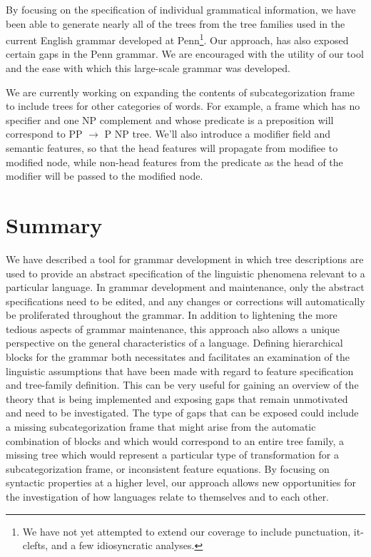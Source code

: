  
 
By focusing on the specification of individual grammatical information, we 
have been able to generate nearly all of the trees from the tree families 
used in the current English grammar developed at Penn\footnote{We have not yet attempted to extend our coverage to include punctuation, it-clefts, and a few idiosyncratic analyses.}. 
 Our approach, has also exposed certain gaps in the Penn grammar. 
We are encouraged with the utility of our tool and the ease with which this 
large-scale grammar was developed. 
 
 
We are currently working on expanding the contents of 
subcategorization frame to include 
trees for other categories of words. For example, 
a frame which has no specifier and one NP complement 
and whose predicate is a preposition will correspond to 
PP $\rightarrow$ P NP tree. We'll also introduce a modifier field 
and semantic features, so that the head features will propagate 
from modifiee to modified node, while non-head features from 
the predicate as the head of the modifier will be passed to 
the modified node. 
 
 
 
 
 
 
 
\section{Summary} 
 
We have described a tool for grammar development in which tree descriptions are 
used to provide an abstract specification of the linguistic phenomena relevant 
to a particular language.  In grammar development and maintenance, only the 
abstract specifications need to be edited, and any changes or corrections will 
automatically be proliferated throughout the grammar.  In addition to 
lightening the more tedious aspects of grammar maintenance, this approach also 
allows a unique perspective on the general characteristics of a language. 
Defining hierarchical blocks for the grammar both necessitates and facilitates 
an examination of the linguistic assumptions that have been made with regard to 
feature specification and tree-family definition. This can be very useful for 
gaining an overview of the theory that is being implemented and exposing gaps 
that remain unmotivated and need to be investigated.  The type of gaps that can 
be exposed could include a missing subcategorization frame that might arise 
from the automatic combination of blocks and which would correspond to an 
entire tree family, a missing tree which would represent a particular type of 
transformation for a subcategorization frame, or inconsistent feature 
equations.  By focusing on syntactic properties at a higher level, our 
approach allows new opportunities for the investigation of how languages relate 
to themselves and to each other. 
 
 
 
% 
 
% 
